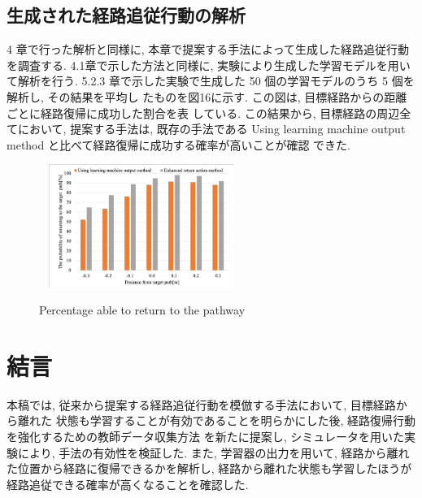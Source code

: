 \documentclass{jarticle}
\begin{document}
\subsection{生成された経路追従行動の解析}
4 章で行った解析と同様に, 本章で提案する手法によって生成した経路追従行動を調査する.
4.1章で示した方法と同様に, 実験により生成した学習モデルを用いて解析を行う.
5.2.3 章で示した実験で生成した 50 個の学習モデルのうち 5 個を解析し, その結果を平均し
たものを図16に示す. この図は, 目標経路からの距離ごとに経路復帰に成功した割合を表
している. この結果から, 目標経路の周辺全てにおいて, 提案する手法は, 既存の手法である
Using learning machine output method と比べて経路復帰に成功する確率が高いことが確認
できた.

\begin{figure}[h!]\
  \centering
   \includegraphics[height=40mm]{./figs/last.png}
   \caption{Percentage able to return to the pathway}
\end{figure}


\section{結言}
本稿では, 従来から提案する経路追従行動を模倣する手法において, 目標経路から離れた
状態も学習することが有効であることを明らかにした後, 経路復帰行動を強化するための教師データ収集方法
を新たに提案し, シミュレータを用いた実験により, 手法の有効性を検証した.
また, 学習器の出力を用いて, 経路から離れた位置から経路に復帰できるかを解析し,
経路から離れた状態も学習したほうが経路追従できる確率が高くなることを確認した.
\vspace*{4mm}
\end{document}
